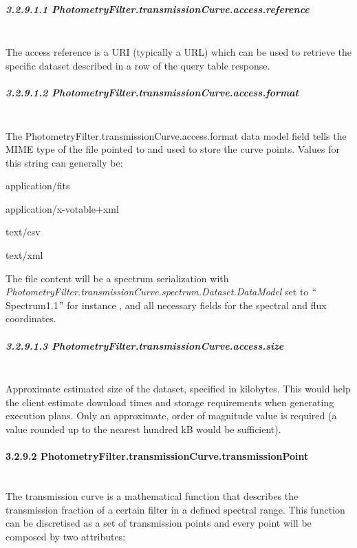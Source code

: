 \documentclass[11pt,a4paper]{ivoa}
\begin{document}
\subparagraph{3.2.9.1.1 PhotometryFilter.transmissionCurve.access.reference} 
\hspace{0pt} \\
The access reference is a URI (typically a URL) which can be used to retrieve the 
specific dataset described in a row of the query table response. \par

\subparagraph{3.2.9.1.2 PhotometryFilter.transmissionCurve.access.format} \hspace{0pt} \\
The PhotometryFilter.transmissionCurve.access.format data model field tells the MIME 
type of the file pointed to and used to store the curve points. Values for this 
string can generally be:\par

application/fits \par
application/x-votable+xml \par
text/csv \par
text/xml
\bigskip



The file content will be a spectrum serialization with 
\textit{PhotometryFilter.transmissionCurve.spectrum.Dataset.DataModel }set to 
$``$Spectrum1.1$"$  for instance , and all necessary fields for the spectral and 
flux coordinates.
\par

\subparagraph{3.2.9.1.3 PhotometryFilter.transmissionCurve.access.size} 
\hspace{0pt} \\
Approximate estimated size of the dataset, specified in kilobytes. This would 
help the client estimate download times and storage requirements when generating 
execution plans. Only an approximate, order of magnitude value is required (a value 
rounded up to the nearest hundred kB would be sufficient).\par

\paragraph{3.2.9.2 PhotometryFilter.transmissionCurve.transmissionPoint} 
\hspace{0pt} \\
The transmission curve is a mathematical function that describes the transmission 
fraction of a certain filter in a defined spectral range. This function can be discretised 
as a set of transmission points and every point will be composed by two attributes:
\par
\end{document}

